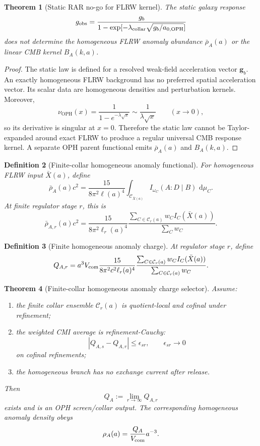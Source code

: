 \documentclass[11pt]{article}
\newtheorem{theorem}{Theorem}[section]
\newtheorem{definition}[theorem]{Definition}
\newcommand{\OPH}{\mathrm{OPH}}
\newcommand{\dd}{\,\mathrm d}
\begin{document}
\begin{theorem}[Static RAR no-go for FLRW kernel]\label{thm:static-rar-no-go}
The static galaxy response
\[
g_{\rm obs}
=
\frac{g_b}{1-\exp[-\lambda_{\rm collar}\sqrt{g_b/a_{0,\OPH}}]}
\]
does not determine the homogeneous FLRW anomaly abundance \(\bar\rho_A(a)\) or the linear CMB
kernel \(B_A(k,a)\).
\end{theorem}

\begin{proof}
The static law is defined for a resolved weak-field acceleration vector \(\mathbf g_b\). An exactly
homogeneous FLRW background has no preferred spatial acceleration vector. Its scalar data are
homogeneous densities and perturbation kernels. Moreover,
\[
\nu_{\OPH}(x)
=
\frac{1}{1-e^{-\lambda\sqrt{x}}}
\sim
\frac{1}{\lambda\sqrt{x}}
\qquad
(x\to0),
\]
so its derivative is singular at \(x=0\). Therefore the static law cannot be Taylor-expanded around
exact FLRW to produce a regular universal CMB response kernel. A separate OPH parent functional
emits \(\bar\rho_A(a)\) and \(B_A(k,a)\).
\end{proof}

\begin{definition}[Finite-collar homogeneous anomaly functional]\label{def:homogeneous-anomaly}
For homogeneous FLRW input \(\bar X(a)\), define
\[
\bar\rho_A(a)c^2
=
\frac{15}{8\pi^2\ell(a)^4}
\int_{\mathcal C_{\bar X(a)}}
I_{\omega_C}(A:D\mid B)\,\dd\mu_C.
\]
At finite regulator stage \(r\), this is
\[
\bar\rho_{A,r}(a)c^2
=
\frac{15}{8\pi^2\ell_r(a)^4}
\frac{\sum_{C\in\mathcal C_r(a)}w_C I_C(\bar X(a))}
{\sum_C w_C}.
\]
\end{definition}

\begin{definition}[Finite homogeneous anomaly charge]\label{def:finite-homogeneous-anomaly-charge}
At regulator stage \(r\), define
\[
Q_{A,r}
=
a^3V_{\rm com}
\frac{15}{8\pi^2c^2\ell_r(a)^4}
\frac{
\sum_{C\in\mathcal C_r(a)}w_CI_C(\bar X(a))
}{
\sum_{C\in\mathcal C_r(a)}w_C
}.
\]
\end{definition}

\begin{theorem}[Finite-collar homogeneous anomaly charge selector]\label{thm:anomaly-dust}
Assume:
\begin{enumerate}[leftmargin=2em]
\item the finite collar ensemble \(\mathcal C_r(a)\) is quotient-local and cofinal under
refinement;
\item the weighted CMI average is refinement-Cauchy:
\[
|Q_{A,s}-Q_{A,r}|\le\epsilon_{sr},
\qquad
\epsilon_{sr}\to0
\]
on cofinal refinements;
\item the homogeneous branch has no exchange current after release.
\end{enumerate}
Then
\[
Q_A:=\lim_{r\to\infty}Q_{A,r}
\]
exists and is an OPH screen/collar output. The corresponding homogeneous anomaly density obeys
\[
\rho_A(a)=\frac{Q_A}{V_{\rm com}}a^{-3}.
\]
\end{theorem}
\end{document}
